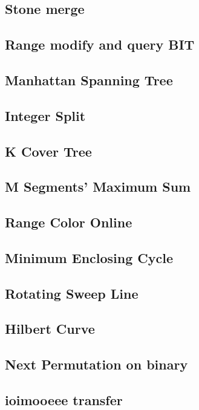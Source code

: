 \documentclass[a4paper,10pt,twocolumn,oneside]{article}
\begin{document}
\subsection{Stone merge}


\subsection{Range modify and query BIT}


\subsection{Manhattan Spanning Tree}


\subsection{Integer Split}


\subsection{K Cover Tree}


\subsection{M Segments' Maximum Sum}


%

\subsection{Range Color Online}


\subsection{Minimum Enclosing Cycle}


\subsection{Rotating Sweep Line}


\subsection{Hilbert Curve}


\subsection{Next Permutation on binary}


\subsection{ioimooeee transfer}

\end{document}
